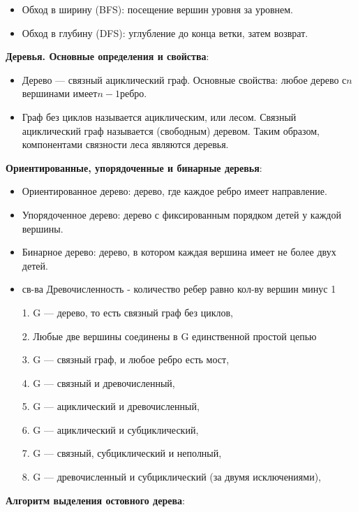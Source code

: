 \documentclass[
]{article}
\providecommand{\tightlist}{%
  \setlength{\itemsep}{0pt}\setlength{\parskip}{0pt}}
\begin{document}
\begin{enumerate}
{{{{{  \begin{itemize}
  \tightlist
  \item
    Обход в ширину (BFS): посещение вершин уровня за уровнем.
  \item
    Обход в глубину (DFS): углубление до конца ветки, затем возврат.
  \end{itemize}
\item
  \textbf{Деревья. Основные определения и свойства}:

  \begin{itemize}
  \tightlist
  \item
    Дерево --- связный ациклический граф. Основные свойства: любое
    дерево с\(n\)вершинами имеет\(n-1\)ребро.
  \item 
Граф без циклов называется ациклическим, или лесом. Связный ациклический
граф называется (свободным) деревом. Таким образом, компонентами связности
леса являются деревья.
  \end{itemize}
\item
  \textbf{Ориентированные, упорядоченные и бинарные деревья}:

  \begin{itemize}
  \tightlist
  \item
    Ориентированное дерево: дерево, где каждое ребро имеет направление.
  \item
    Упорядоченное дерево: дерево с фиксированным порядком детей у каждой
    вершины.
  \item
    Бинарное дерево: дерево, в котором каждая вершина имеет не более
    двух детей.
  \item св-ва
    Древочисленность - количество ребер равно кол-ву вершин минус 1 

1. G — дерево, то есть связный граф без циклов,

2. Любые две вершины соединены в G единственной простой цепью

3. G — связный граф, и любое ребро есть мост,

4. G — связный и древочисленный,

5. G — ациклический и древочисленный,

6. G — ациклический и субциклический,

7. G — связный, субциклический и неполный,

8. G — древочисленный и субциклический (за двумя исключениями),
  \end{itemize}
\item
  \textbf{Алгоритм выделения остовного дерева}:
  
}}}}}
\end{enumerate}
\end{document}
